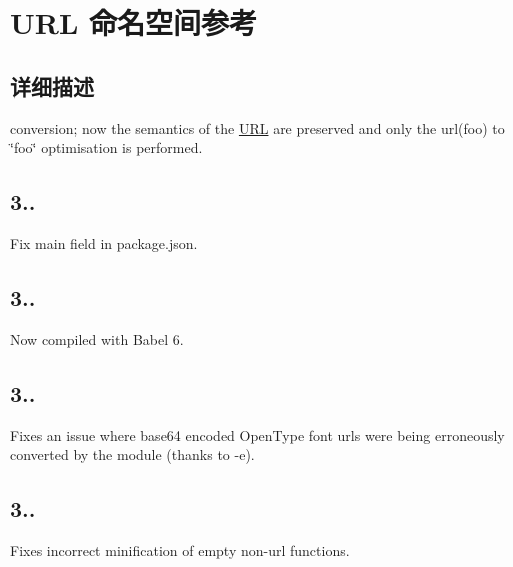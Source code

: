 \hypertarget{namespace_u_r_l}{}\section{U\+RL 命名空间参考}
\label{namespace_u_r_l}


\subsection{详细描述}
conversion; now the semantics of the \mbox{\hyperlink{namespace_u_r_l}{U\+RL}} are preserved and only the {\ttfamily url(foo)} to {\ttfamily \char`\"{}foo\char`\"{}} optimisation is performed.

\subsection*{3..}


\begin{DoxyItemize}
\item Fix {\ttfamily main} field in {\ttfamily package.\+json}.
\end{DoxyItemize}

\subsection*{3..}


\begin{DoxyItemize}
\item Now compiled with Babel 6.
\end{DoxyItemize}

\subsection*{3..}


\begin{DoxyItemize}
\item Fixes an issue where base64 encoded Open\+Type font urls were being erroneously converted by the module (thanks to -\/e).
\end{DoxyItemize}

\subsection*{3..}


\begin{DoxyItemize}
\item Fixes incorrect minification of empty non-\/url functions.
\end{DoxyItemize}

